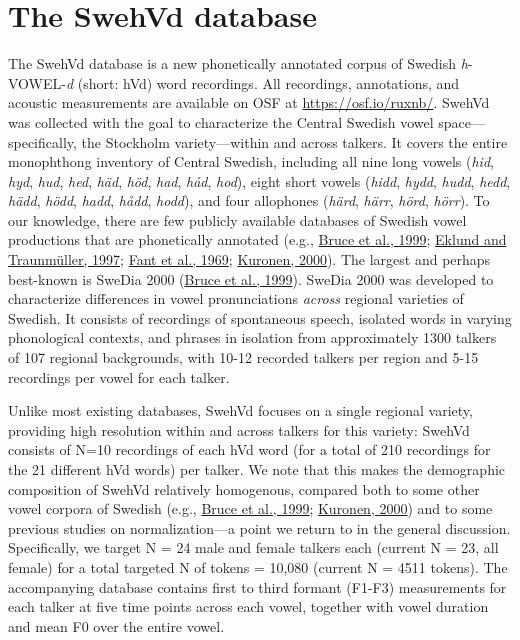 \documentclass[utf8]{frontiersSCNS}
\begin{document}
\hypertarget{sec:swehvd}{%
\section*{The SwehVd database}\label{sec:swehvd}}

The SwehVd database is a new phonetically annotated corpus of Swedish \emph{h}-VOWEL-\emph{d} (short: hVd) word recordings. All recordings, annotations, and acoustic measurements are available on OSF at \url{https://osf.io/ruxnb/}. SwehVd was collected with the goal to characterize the Central Swedish vowel space---specifically, the Stockholm variety---within and across talkers. It covers the entire monophthong inventory of Central Swedish, including all nine long vowels (\emph{hid}, \emph{hyd}, \emph{hud}, \emph{hed}, \emph{häd}, \emph{höd}, \emph{had}, \emph{håd}, \emph{hod}), eight short vowels (\emph{hidd}, \emph{hydd}, \emph{hudd}, \emph{hedd}, \emph{hädd}, \emph{hödd}, \emph{hadd}, \emph{hådd}, \emph{hodd}), and four allophones (\emph{härd}, \emph{härr}, \emph{hörd}, \emph{hörr}). To our knowledge, there are few publicly available databases of Swedish vowel productions that are phonetically annotated (e.g., \protect\hyperlink{ref-bruce1999}{Bruce et al., 1999}; \protect\hyperlink{ref-eklund1997}{Eklund and Traunmüller, 1997}; \protect\hyperlink{ref-fant1969}{Fant et al., 1969}; \protect\hyperlink{ref-kuronen2000}{Kuronen, 2000}). The largest and perhaps best-known is SweDia 2000 (\protect\hyperlink{ref-bruce1999}{Bruce et al., 1999}). SweDia 2000 was developed to characterize differences in vowel pronunciations \emph{across} regional varieties of Swedish. It consists of recordings of spontaneous speech, isolated words in varying phonological contexts, and phrases in isolation from approximately 1300 talkers of 107 regional backgrounds, with 10-12 recorded talkers per region and 5-15 recordings per vowel for each talker.

Unlike most existing databases, SwehVd focuses on a single regional variety, providing high resolution within and across talkers for this variety: SwehVd consists of N=10 recordings of each hVd word (for a total of 210 recordings for the 21 different hVd words) per talker. We note that this makes the demographic composition of SwehVd relatively homogenous, compared both to some other vowel corpora of Swedish (e.g., \protect\hyperlink{ref-bruce1999}{Bruce et al., 1999}; \protect\hyperlink{ref-kuronen2000}{Kuronen, 2000}) and to some previous studies on normalization---a point we return to in the general discussion. Specifically, we target N = 24 male and female talkers each (current N = 23, all female) for a total targeted N of tokens = 10,080 (current N = 4511 tokens). The accompanying database contains first to third formant (F1-F3) measurements for each talker at five time points across each vowel, together with vowel duration and mean F0 over the entire vowel.
\end{document}
